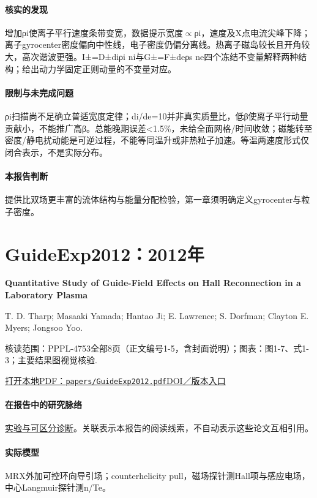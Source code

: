 \paragraph{核实的发现}增加ρi使离子平行速度条带变宽，数据提示宽度\ensuremath{\propto}ρi，速度及X点电流尖峰下降；离子gyrocenter密度偏向中性线，电子密度仍偏分离线。热离子磁岛较长且开角较大，高次谐波更强。I±=D±diρi ni与G±=F±deρs ne四个冻结不变量解释两种结构；给出动力学固定正则动量的不变量对应。

\paragraph{限制与未完成问题}ρi扫描尚不足确立普适宽度定律；di/de=10并非真实质量比，低β使离子平行动量贡献小，不能推广高β。总能晚期误差<1.5\%，未给全面网格/时间收敛；磁能转至密度/静电扰动能是可逆过程，不能等同温升或非热粒子加速。等温两速度形式仅闭合表示，不是实际分布。

\paragraph{本报告判断}提供比双场更丰富的流体结构与能量分配检验，第一章须明确定义gyrocenter与粒子密度。

\section{GuideExp2012：2012年}\label{paper:GuideExp2012}

\textbf{Quantitative Study of Guide-Field Effects on Hall Reconnection in a Laboratory Plasma}\citep{GuideExp2012}\

T. D. Tharp;  Masaaki Yamada;  Hantao Ji;  E. Lawrence;  S. Dorfman;  Clayton E. Myers;  Jongsoo Yoo.

\textsf{核读范围：}PPPL-4753全部8页（正文编号1-5，含封面说明）；\textsf{图表：}图1-7、式1-3；主要结果图视觉核验.

\href{run:papers/GuideExp2012.pdf}{打开本地PDF：\texttt{papers/GuideExp2012.pdf}}\quad\href{https://doi.org/10.1103/physrevlett.109.165002}{DOI／版本入口}

\paragraph{在报告中的研究脉络}\hyperref[story:diagnostic]{实验与可区分诊断}。关联表示本报告的阅读线索，不自动表示这些论文互相引用。

\paragraph{实际模型}MRX外加可控环向导引场；counterhelicity pull，磁场探针测Hall项与感应电场，中心Langmuir探针测n/Te。


